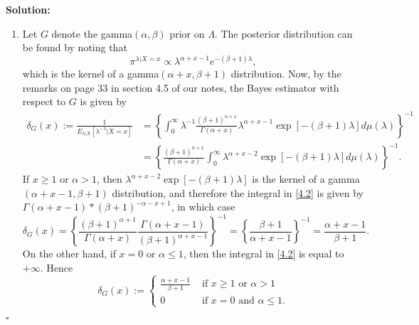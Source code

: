 \documentclass[12pt]{article}
\newcounter{ProofCounter}
\newenvironment{Solution}{\stepcounter{ProofCounter}\textbf{Solution:}}{\hfill$\square$}
\begin{document}
\begin{Solution}
\begin{enumerate}[label=(\alph*),leftmargin=6mm]
  \item Let $G$ denote the gamma$(\alpha, \beta)$ prior on $\Lambda$. The posterior distribution can be found by noting that 
    \[ \pi^{\lambda|X=x} \propto \lambda^{\alpha + x - 1}e^{-(\beta + 1)\lambda}, \]
    which is the kernel of a gamma$(\alpha + x, \beta + 1)$ distribution. Now,
    by the remarks on page 33 in section 4.5 of our notes, the Bayes estimator with
    respect to $G$ is given by 
    \begin{align}
      \delta_{G}(x) := \frac{1}{E_{\lambda|X}[\lambda^{-1}|X=x]} & = \left\{ \int_{0}^{\infty}\lambda^{-1} \frac{(\beta + 1)^{\alpha +
        x}}{\Gamma(\alpha + x)} \lambda^{\alpha + x - 1}\exp\left[ -(\beta + 1)\lambda \right]d\mu(\lambda) \right\}^{-1} \nonumber \\
        & = \left\{ \frac{(\beta+1)^{\alpha + x}}{\Gamma(\alpha + x)} \int_{0}^{\infty} \lambda^{\alpha + x - 2}\exp\left[ -(\beta+1)\lambda
        \right]d\mu(\lambda) \right\}^{-1}. \label{4.2}
    \end{align}
    If $x \geq 1$ or $\alpha > 1$, then $\lambda^{\alpha + x -2}\exp\left[ -(\beta + 1)\lambda \right]$ is the kernel of a gamma$(\alpha + x - 1,
    \beta + 1)$ distribution, and therefore the integral in \eqref{4.2} is given by $\Gamma(\alpha + x - 1) * (\beta + 1)^{-\alpha - x + 1}$,
    in which case 
    \[
      \delta_{G}(x) = \left\{ \frac{(\beta+1)^{\alpha + 1}}{\Gamma(\alpha + x)} \frac{\Gamma(\alpha + x - 1)}{(\beta + 1)^{\alpha + x - 1}}
        \right\}^{-1} = \left\{ \frac{\beta + 1}{\alpha + x - 1} \right\}^{-1} = \frac{\alpha + x - 1}{\beta + 1}.
    \]
    On the
    other hand, if $x = 0$ or $\alpha \leq 1$, then the integral in \eqref{4.2} is equal to $+\infty$. Hence 
    \begin{equation}
      \delta_{G}(x) := \left\{ \begin{array}{cl}
          \frac{\alpha + x - 1}{\beta + 1} & \text{ if } x \geq 1 \text{ or } \alpha > 1 \\
          0 & \text{ if } x = 0 \text{ and } \alpha \leq 1. 
      \end{array}\right.
      \label{4.3}
    \end{equation}



\end{enumerate}
\end{Solution}
\end{document}
